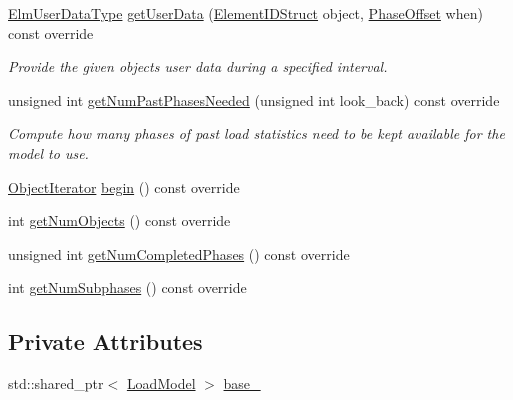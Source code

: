 \begin{DoxyCompactItemize}
\hyperlink{namespacevt_1_1vrt_1_1collection_1_1balance_abf9eea0f4c24e41036ab844025e7d4c8}{Elm\+User\+Data\+Type} \hyperlink{classvt_1_1vrt_1_1collection_1_1balance_1_1_composed_model_a7dd57ecfc88feafe6e51df62c7164c63}{get\+User\+Data} (\hyperlink{namespacevt_1_1vrt_1_1collection_1_1balance_a9f5b53fafb270212279a4757d2c4cd28}{Element\+I\+D\+Struct} object, \hyperlink{structvt_1_1vrt_1_1collection_1_1balance_1_1_phase_offset}{Phase\+Offset} when) const override
\begin{DoxyCompactList}\small\item\em Provide the given object\textquotesingle{}s user data during a specified interval. \end{DoxyCompactList}\item 
unsigned int \hyperlink{classvt_1_1vrt_1_1collection_1_1balance_1_1_composed_model_a20bb994d1b3b27eb2a82729d7d5c30f3}{get\+Num\+Past\+Phases\+Needed} (unsigned int look\+\_\+back) const override
\begin{DoxyCompactList}\small\item\em Compute how many phases of past load statistics need to be kept available for the model to use. \end{DoxyCompactList}\item 
\hyperlink{structvt_1_1vrt_1_1collection_1_1balance_1_1_object_iterator}{Object\+Iterator} \hyperlink{classvt_1_1vrt_1_1collection_1_1balance_1_1_composed_model_a7d32b6f8a0ca5970674238325df11783}{begin} () const override
\item 
int \hyperlink{classvt_1_1vrt_1_1collection_1_1balance_1_1_composed_model_abd58ffd308443021356aff2595c6980f}{get\+Num\+Objects} () const override
\item 
unsigned int \hyperlink{classvt_1_1vrt_1_1collection_1_1balance_1_1_composed_model_a85bd890eb6e94c85cbfeb9ef321139dc}{get\+Num\+Completed\+Phases} () const override
\item 
int \hyperlink{classvt_1_1vrt_1_1collection_1_1balance_1_1_composed_model_a744a16572614d11e554b1bf53b7c57f6}{get\+Num\+Subphases} () const override
\end{DoxyCompactItemize}
\subsection*{Private Attributes}
\begin{DoxyCompactItemize}
\item 
std\+::shared\+\_\+ptr$<$ \hyperlink{structvt_1_1vrt_1_1collection_1_1balance_1_1_load_model}{Load\+Model} $>$ \hyperlink{classvt_1_1vrt_1_1collection_1_1balance_1_1_composed_model_a8a2a6b2d5e79a7c02002132913c9ae55}{base\+\_\+}
\end{DoxyCompactItemize}


